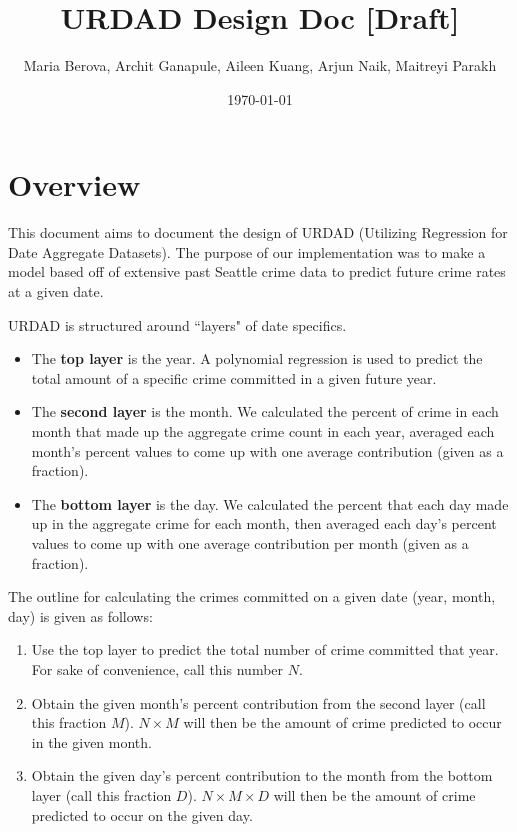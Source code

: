 \documentclass{article}
\title{\textbf{URDAD Design Doc [Draft]}}
\author{Maria Berova, Archit Ganapule, Aileen Kuang, Arjun Naik, Maitreyi Parakh}
\date{\today}
\begin{document}
\maketitle

\section{Overview}

This document aims to document the design of URDAD (Utilizing Regression for Date Aggregate Datasets). The purpose of our implementation was to make a model based off of extensive past Seattle crime data to predict future crime rates at a given date. \bigskip 

URDAD is structured around ``layers" of date specifics. 

\begin{itemize}
    \item The \textbf{top layer} is the year. A polynomial regression is used to predict the total amount of a specific crime committed in a given future year. 
    \item The \textbf{second layer} is the month. We calculated the percent of crime in each month that made up the aggregate crime count in each year, averaged each month's percent values to come up with one average contribution (given as a fraction). 
    \item The \textbf{bottom layer} is the day. We calculated the percent that each day made up in the aggregate crime for each month, then averaged each day's percent values to come up with one average contribution per month (given as a fraction). 
\end{itemize}

The outline for calculating the crimes committed on a given date (year, month, day) is given as follows:

\begin{enumerate}
    \item Use the top layer to predict the total number of crime committed that year. For sake of convenience, call this number $N$.
    \item Obtain the given month's percent contribution from the second layer (call this fraction $M$). $N \times M$ will then be the amount of crime predicted to occur in the given month.
    \item Obtain the given day's percent contribution to the month from the bottom layer (call this fraction $D$). $N \times M \times D$ will then be the amount of crime predicted to occur on the given day.
\end{enumerate}
\end{document}
